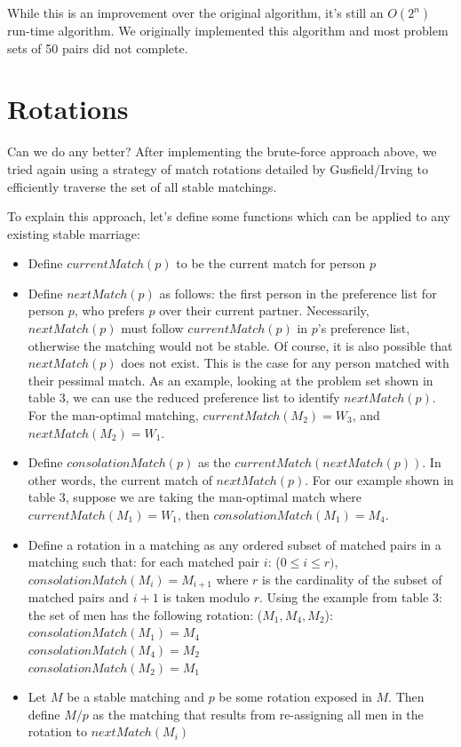 \documentclass[a4paper]{article}
\begin{document}
While this is an improvement over the original algorithm, it's still an $O(2^n)$ run-time algorithm. We originally implemented this algorithm and most problem sets of 50 pairs did not complete.
\newpage
\section{Rotations}
Can we do any better? After implementing the brute-force approach above, we tried again using a strategy of match rotations detailed by Gusfield/Irving \cite{gusfield} to efficiently traverse the set of all stable matchings.

To explain this approach, let's define some functions which can be applied to any existing stable marriage:
\begin{itemize}
    \item Define $currentMatch(p)$ to be the current match for person $p$
    \item Define $nextMatch(p)$ as follows: the first person in the preference list for person $p$, who prefers $p$ over their current partner. Necessarily, $nextMatch(p)$ must follow $currentMatch(p)$ in $p$'s preference list, otherwise the matching would not be stable. Of course, it is also possible that $nextMatch(p)$ does not exist. This is the case for any person matched with their pessimal match. As an example, looking at the problem set shown in table 3, we can use the reduced preference list to identify $nextMatch(p)$.  For the man-optimal matching, $currentMatch(M_2) = W_3$, and $nextMatch(M_2) = W_1$.
    \item Define $consolationMatch(p)$ as the $currentMatch(nextMatch(p))$. In other words, the current match of $nextMatch(p)$. For our example shown in table 3, suppose we are taking the man-optimal match where $currentMatch(M_1) = W_1$, then $consolationMatch(M_1) = M_4$.
    \item Define a rotation in a matching as any ordered subset of matched pairs in a matching such that: for each matched pair $i$: ($0 \leq i \leq r)$, $consolationMatch(M_i) = M_{i+1}$ where $r$ is the cardinality of the subset of matched pairs and $i+1$ is taken modulo $r$. Using the example from table 3: the set of men has the following rotation: ($M_1, M_4, M_2$): \\
    $consolationMatch(M_1) = M_4$ \\
    $consolationMatch(M_4) = M_2$ \\
    $consolationMatch(M_2) = M_1$
    \item Let $M$ be a stable matching and $p$ be some rotation exposed in $M$. Then define $M / p$ as the matching that results from re-assigning all men in the rotation to $nextMatch(M_i)$

\end{itemize}
\end{document}

